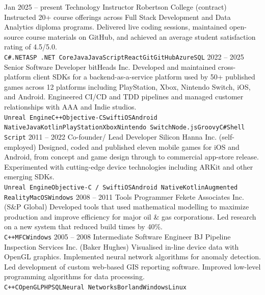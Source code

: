 \documentclass[9pt]{developercv}
\begin{document}
\begin{entrylist}
	\entry
		{Jan 2025 -- present}
		{Technology Instructor}
		{Robertson College (contract)}
		{Instructed 20+ course offerings across Full Stack Development and Data Analytics diploma programs. Delivered live coding sessions, maintained open-source course materials on GitHub, and achieved an average student satisfaction rating of 4.5/5.0.\\ \texttt{C\#}\slashsep\texttt{.NET}\slashsep\texttt{ASP .NET Core}\slashsep\texttt{Java}\slashsep\texttt{JavaScript}\slashsep\texttt{React}\slashsep\texttt{Git}\slashsep\texttt{GitHub}\slashsep\texttt{Azure}\slashsep\texttt{SQL}}
	\entry
		{2022 -- 2025}
		{Senior Software Developer}
		{bitHeads Inc.}
		{Developed and maintained cross-platform client SDKs for a backend-as-a-service platform used by 50+ published games across 12 platforms including PlayStation, Xbox, Nintendo Switch, iOS, and Android. Engineered CI/CD and TDD pipelines and managed customer relationships with AAA and Indie studios.\\ \texttt{Unreal Engine}\slashsep\texttt{C++}\slashsep\texttt{Objective-C}\slashsep\texttt{Swift}\slashsep\texttt{iOS}\slashsep\texttt{Android Native}\slashsep\texttt{Java}\slashsep\texttt{Kotlin}\slashsep\texttt{PlayStation}\slashsep\texttt{Xbox}\slashsep\texttt{Nintendo Switch}\slashsep\texttt{Node.js}\slashsep\texttt{Groovy}\slashsep\texttt{C\#}\slashsep\texttt{Shell Script}}
	\entry
		{2011 -- 2022}
		{Co-founder/ Lead Developer}
		{Silicon Hanna Inc. (self-employed)}
		{Designed, coded and published eleven mobile games for iOS and Android, from concept and game design through to commercial app-store release. Experimented with cutting-edge device technologies including ARKit and other emerging SDKs.\\ \texttt{Unreal Engine}\slashsep\texttt{Objective-C / Swift}\slashsep\texttt{iOS}\slashsep\texttt{Android Native}\slashsep\texttt{Kotlin}\slashsep\texttt{Augmented Reality}\slashsep\texttt{MacOS}\slashsep\texttt{Windows}}
	\entry
		{2008 -- 2011}
		{Tools Programmer}
		{Fekete Associates Inc. (S\&P Global)}
		{Developed tools that used mathematical modelling to maximize production and improve efficiency for major oil \& gas corporations. Led research on a new system that reduced build times by 40\%.\\ \texttt{C++}\slashsep\texttt{MFC}\slashsep\texttt{Windows}}
	\entry
		{2005 -- 2008}
		{Intermediate Software Engineer}
		{BJ Pipeline Inspection Services Inc. (Baker Hughes)}
		{Visualised in-line device data with OpenGL graphics. Implemented neural network algorithms for anomaly detection. Led development of custom web-based GIS reporting software. Improved low-level programming algorithms for data processing.\\ \texttt{C++}\slashsep\texttt{C}\slashsep\texttt{OpenGL}\slashsep\texttt{PHP}\slashsep\texttt{SQL}\slashsep\texttt{Neural Networks}\slashsep\texttt{Borland}\slashsep\texttt{Windows}\slashsep\texttt{Linux}}

\end{entrylist}
\end{document}
